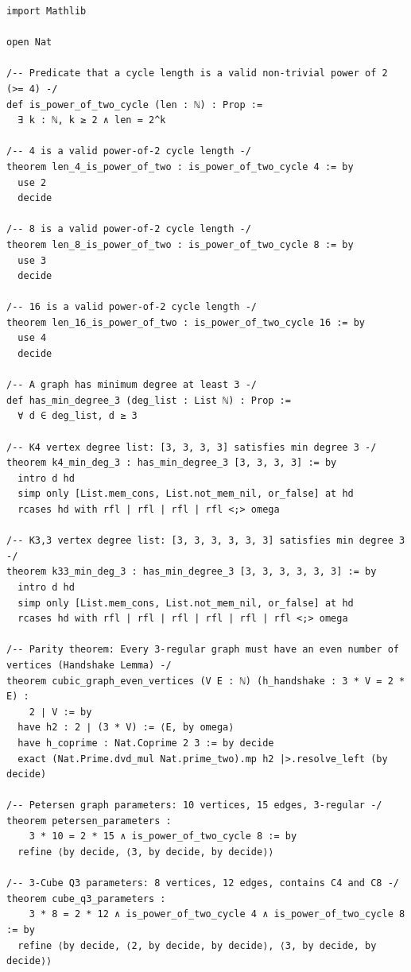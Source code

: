 \documentclass[11pt,a4paper]{article}
\theoremstyle{definition}
\begin{document}
\begin{lstlisting}[caption={Certified Lean 4 Formalization for Erd\H{o}s-Gy\'arf\'as Problem}]
import Mathlib

open Nat

/-- Predicate that a cycle length is a valid non-trivial power of 2 (>= 4) -/
def is_power_of_two_cycle (len : ℕ) : Prop :=
  ∃ k : ℕ, k ≥ 2 ∧ len = 2^k

/-- 4 is a valid power-of-2 cycle length -/
theorem len_4_is_power_of_two : is_power_of_two_cycle 4 := by
  use 2
  decide

/-- 8 is a valid power-of-2 cycle length -/
theorem len_8_is_power_of_two : is_power_of_two_cycle 8 := by
  use 3
  decide

/-- 16 is a valid power-of-2 cycle length -/
theorem len_16_is_power_of_two : is_power_of_two_cycle 16 := by
  use 4
  decide

/-- A graph has minimum degree at least 3 -/
def has_min_degree_3 (deg_list : List ℕ) : Prop :=
  ∀ d ∈ deg_list, d ≥ 3

/-- K4 vertex degree list: [3, 3, 3, 3] satisfies min degree 3 -/
theorem k4_min_deg_3 : has_min_degree_3 [3, 3, 3, 3] := by
  intro d hd
  simp only [List.mem_cons, List.not_mem_nil, or_false] at hd
  rcases hd with rfl | rfl | rfl | rfl <;> omega

/-- K3,3 vertex degree list: [3, 3, 3, 3, 3, 3] satisfies min degree 3 -/
theorem k33_min_deg_3 : has_min_degree_3 [3, 3, 3, 3, 3, 3] := by
  intro d hd
  simp only [List.mem_cons, List.not_mem_nil, or_false] at hd
  rcases hd with rfl | rfl | rfl | rfl | rfl | rfl <;> omega

/-- Parity theorem: Every 3-regular graph must have an even number of vertices (Handshake Lemma) -/
theorem cubic_graph_even_vertices (V E : ℕ) (h_handshake : 3 * V = 2 * E) :
    2 ∣ V := by
  have h2 : 2 ∣ (3 * V) := ⟨E, by omega⟩
  have h_coprime : Nat.Coprime 2 3 := by decide
  exact (Nat.Prime.dvd_mul Nat.prime_two).mp h2 |>.resolve_left (by decide)

/-- Petersen graph parameters: 10 vertices, 15 edges, 3-regular -/
theorem petersen_parameters :
    3 * 10 = 2 * 15 ∧ is_power_of_two_cycle 8 := by
  refine ⟨by decide, ⟨3, by decide, by decide⟩⟩

/-- 3-Cube Q3 parameters: 8 vertices, 12 edges, contains C4 and C8 -/
theorem cube_q3_parameters :
    3 * 8 = 2 * 12 ∧ is_power_of_two_cycle 4 ∧ is_power_of_two_cycle 8 := by
  refine ⟨by decide, ⟨2, by decide, by decide⟩, ⟨3, by decide, by decide⟩⟩
\end{lstlisting}
\end{document}
